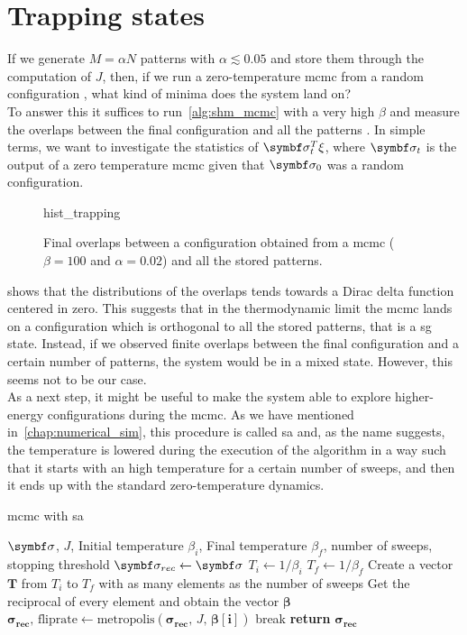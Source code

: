 \documentclass[\rootdir/main.tex]{subfiles}
\begin{document}
\section{Trapping states}\label{sec:trapping_states}
If we generate $M = \alpha N$ patterns with $\alpha \lesssim 0.05$ and store them through the computation of $J$, then, if we run a zero-temperature \acrlong{mcmc} from a random configuration \bsigma, what kind of minima does the system land on?\\
To answer this it suffices to run~\cref{alg:shm_mcmc} with a very high $\beta$ and measure the overlaps between the final configuration and all the patterns \bxi. In simple terms, we want to investigate the statistics of $\bsigma_t^T \xi$, where $\bsigma_t$ is the output of a zero temperature \acrlong{mcmc} given that $\bsigma_0$ was a random configuration.
\begin{figure}[hbt]
    \centering
    {hist_trapping}
    \label{fig:hist_trapping}
    \caption{Final overlaps between a configuration obtained from a \acrshort{mcmc} ($\beta = 100$ and $\alpha = 0.02$) and all the stored patterns.}
\end{figure}
 shows that the distributions of the overlaps tends towards a Dirac delta function centered in zero. This suggests that in the thermodynamic limit the \acrlong{mcmc} lands on a configuration which is orthogonal to all the stored patterns, that is a \acrlong{sg} state. Instead, if we observed finite overlaps between the final configuration and a certain number of patterns, the system would be in a mixed state. However, this seems not to be our case.\\
As a next step, it might be useful to make the system able to explore higher-energy configurations during the \acrlong{mcmc}. As we have mentioned in~\cref{chap:numerical_sim}, this procedure is called \acrlong{sa} and, as the name suggests, the temperature is lowered during the execution of the algorithm in a way such that it starts with an high temperature for a certain number of sweeps, and then it ends up with the standard zero-temperature dynamics.
\begin{algorithm}
    \caption{\acrlong{mcmc} with \acrlong{sa}}
    \label{alg:mcmc_sa}
    \begin{algorithmic}[1]
    \Require $\bsigma$, $J$, Initial temperature $\beta_i$, Final temperature $\beta_f$, number of sweeps, stopping threshold
    \State $\bsigma_{rec} \gets \bsigma$
    \State $T_i \gets 1/\beta_i$
    \State $T_f \gets 1/\beta_f$
    \State Create a vector $\symbf{T}$ from $T_i$ to $T_f$ with as many elements as the number of sweeps
    \State Get the reciprocal of every element and obtain the vector $\symbf{\beta}$
            \State $\symbf{\sigma_{\text{rec}}},\, \text{fliprate} \gets \text{metropolis}\left(\symbf{\sigma_{\text{rec}}},\, J,\, \symbf{\beta[i]} \right)$  
                \State break
            \EndIf
        \EndFor
    \State \textbf{return} $\symbf{\sigma_{\text{rec}}}$
\end{algorithmic}
\end{algorithm}
\end{document}

